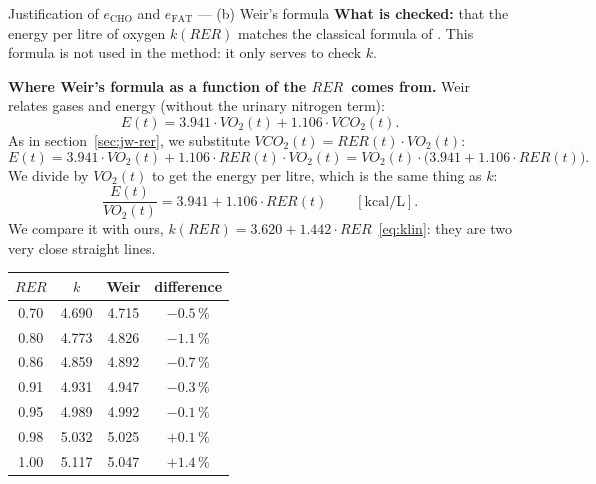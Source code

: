 \documentclass[10pt,a4paper]{article}
\newcommand{\sub}[1]{{\scriptscriptstyle\mathrm{#1}}}   %
\newcommand{\CHO}{\sub{CHO}}
\newcommand{\FAT}{\sub{FAT}}
\newcommand{\VO}{\ensuremath{\mathit{VO}_2}}               %
\newcommand{\VCO}{\ensuremath{\mathit{VCO}_2}}
\newcommand{\RER}{\ensuremath{\mathit{RER}}}
\newcommand{\kcal}{\ensuremath{\mathrm{kcal}}}
\begin{document}
\begin{requadre}{Justification of $e_{\CHO}$ and $e_{\FAT}$ --- (b) Weir's formula}
\textbf{What is checked:} that the energy per litre of oxygen $k(\RER)$ matches the
classical formula of \citet{weir1949}. This formula is not used in the method: it only
serves to check $k$.

\smallskip
\textbf{Where Weir's formula as a function of the \RER\ comes from.} Weir relates gases and
energy (without the urinary nitrogen term):
\[
  E(t)=3.941\cdot\VO(t)+1.106\cdot\VCO(t).
\]
As in section~\ref{sec:jw-rer}, we substitute $\VCO(t)=\RER(t)\cdot\VO(t)$:
\[
  E(t)=3.941\cdot\VO(t)+1.106\cdot\RER(t)\cdot\VO(t)=\VO(t)\cdot\bigl(3.941+1.106\cdot\RER(t)\bigr).
\]
We divide by $\VO(t)$ to get the energy per litre, which is the same thing as $k$:
\[
  \frac{E(t)}{\VO(t)}=3.941+1.106\cdot\RER(t)\qquad[\kcal/\mathrm{L}].
\]
We compare it with ours, $k(\RER)=3.620+1.442\cdot\RER$~\eqref{eq:klin}: they are two very
close straight lines.

\medskip
\noindent
\begin{minipage}[c]{0.44\linewidth}
\centering
\footnotesize
\begin{tabular}{@{}cccc@{}}
\toprule
\RER & $k$ & Weir & difference \\
\midrule
0.70 & 4.690 & 4.715 & $-0.5\,\%$ \\
0.80 & 4.773 & 4.826 & $-1.1\,\%$ \\
0.86 & 4.859 & 4.892 & $-0.7\,\%$ \\
0.91 & 4.931 & 4.947 & $-0.3\,\%$ \\
0.95 & 4.989 & 4.992 & $-0.1\,\%$ \\
0.98 & 5.032 & 5.025 & $+0.1\,\%$ \\
1.00 & 5.117 & 5.047 & $+1.4\,\%$ \\
\bottomrule
\end{tabular}


\end{minipage}
\end{requadre}
\end{document}

